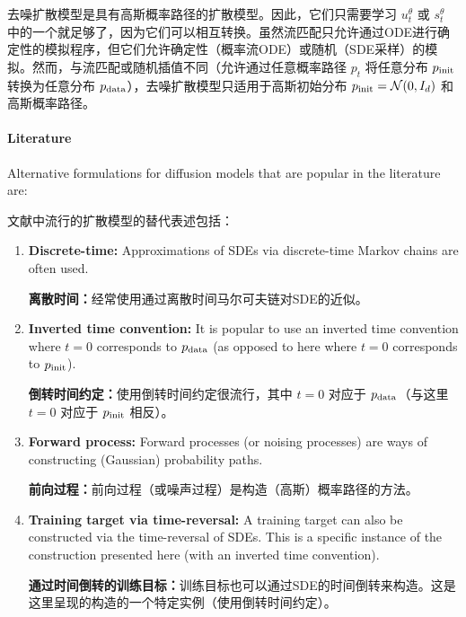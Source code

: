 \begin{summarybox}
去噪扩散模型是具有高斯概率路径的扩散模型。因此，它们只需要学习 $u_t^\theta$ 或 $s_t^\theta$ 中的一个就足够了，因为它们可以相互转换。虽然流匹配只允许通过ODE进行确定性的模拟程序，但它们允许确定性（概率流ODE）或随机（SDE采样）的模拟。然而，与流匹配或随机插值不同（允许通过任意概率路径 $p_t$ 将任意分布 $p_{\rm{init}}$ 转换为任意分布 $p_{\rm{data}}$），去噪扩散模型只适用于高斯初始分布 $p_{\rm{init}}=\mathcal{N}(0,I_d)$ 和高斯概率路径。\\

\paragraph{Literature} Alternative formulations for diffusion models that are popular in the literature are:

文献中流行的扩散模型的替代表述包括：
\begin{enumerate}
    \item \textbf{\sffamily Discrete-time: }Approximations of SDEs via discrete-time Markov chains are often used.
    
    \textbf{\sffamily 离散时间：}经常使用通过离散时间马尔可夫链对SDE的近似。
    \item \textbf{\sffamily Inverted time convention: }It is popular to use an inverted time convention where $t=0$ corresponds to $p_{\rm{data}}$ (as opposed to here where $t=0$ corresponds to $p_{\rm{init}}$).
    
    \textbf{\sffamily 倒转时间约定：}使用倒转时间约定很流行，其中 $t=0$ 对应于 $p_{\rm{data}}$（与这里 $t=0$ 对应于 $p_{\rm{init}}$ 相反）。
    \item \textbf{\sffamily Forward process: }Forward processes (or noising processes) are ways of constructing (Gaussian) probability paths.
    
    \textbf{\sffamily 前向过程：}前向过程（或噪声过程）是构造（高斯）概率路径的方法。
    \item \textbf{\sffamily Training target via time-reversal:} A training target can also be  constructed via the time-reversal of SDEs. This is a specific instance of the construction presented here (with an inverted time convention).
    
    \textbf{\sffamily 通过时间倒转的训练目标：}训练目标也可以通过SDE的时间倒转来构造。这是这里呈现的构造的一个特定实例（使用倒转时间约定）。
\end{enumerate}
\end{summarybox}

